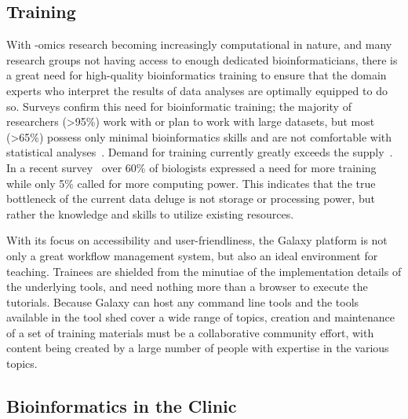\begin{justify}
\subsection{Training}
With -omics research becoming increasingly computational in nature, and many research groups not having access to enough dedicated bioinformaticians, there is a great need for high-quality bioinformatics training to ensure that the domain experts who interpret the results of data analyses are optimally equipped to do so. Surveys confirm this need for bioinformatic training; the majority of researchers (>95\%) work with or plan to work with large datasets, but most (>65\%) possess only minimal bioinformatics skills and are not comfortable with statistical analyses~\cite{larcombe2017elixir,williams2017vision}. Demand for training currently greatly exceeds the supply~\cite{attwood2017global}. In a recent survey~\cite{survey2013embl} over 60\% of biologists expressed a need for more training while only 5\% called for more computing power. This indicates that the true bottleneck of the current data deluge is not storage or processing power, but rather the knowledge and skills to utilize existing resources.

With its focus on accessibility and user-friendliness, the Galaxy platform is not only a great workflow management system, but also an ideal environment for teaching. Trainees are shielded from the minutiae of the implementation details of the underlying tools, and need nothing more than a browser to execute the tutorials. Because Galaxy can host any command line tools and the tools available in the tool shed cover a wide range of topics, creation and maintenance of a set of training materials must be a collaborative community effort, with content being created by a large number of people with expertise in the various topics.

\subsection{Bioinformatics in the Clinic}


\end{justify}
